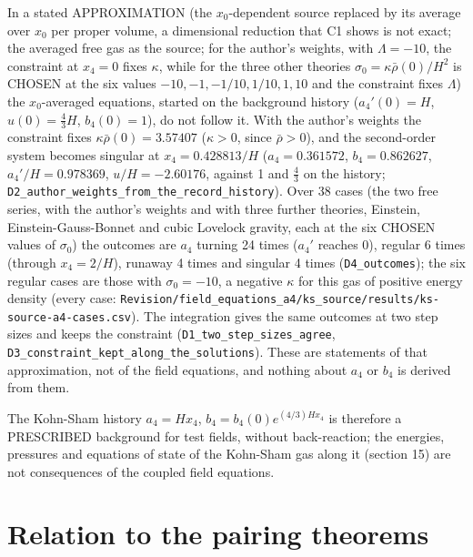 \documentclass[11pt]{article}
\begin{document}
In a stated APPROXIMATION (the $x_0$-dependent source replaced by its average over $x_0$ per proper volume, a dimensional reduction that C1 shows is not exact; the averaged free gas as the source; for the author's weights, with $\Lambda = -10$, the constraint at $x_4 = 0$ fixes $\kappa$, while for the three other theories $\sigma_0 = \kappa\bar\rho(0)/H^2$ is CHOSEN at the six values $-10, -1, -1/10, 1/10, 1, 10$ and the constraint fixes $\Lambda$) the $x_0$-averaged equations, started on the background history ($a_4'(0) = H$, $u(0) = \tfrac43H$, $b_4(0) = 1$), do not follow it. With the author's weights the constraint fixes $\kappa\bar\rho(0) = 3.57407$ ($\kappa > 0$, since $\bar\rho > 0$), and the second-order system becomes singular at $x_4 = 0.428813/H$ ($a_4 = 0.361572$, $b_4 = 0.862627$, $a_4'/H = 0.978369$, $u/H = -2.60176$, against 1 and $\tfrac43$ on the history; \texttt{D2\_autho\allowbreak{}r\_weight\allowbreak{}s\_from\_t\allowbreak{}he\_recor\allowbreak{}d\_histor\allowbreak{}y}). Over 38 cases (the two free series, with the author's weights and with three further theories, Einstein, Einstein-Gauss-Bonnet and cubic Lovelock gravity, each at the six CHOSEN values of $\sigma_0$) the outcomes are $a_4$ turning 24 times ($a_4'$ reaches 0), regular 6 times (through $x_4 = 2/H$), runaway 4 times and singular 4 times (\texttt{D4\_outco\allowbreak{}mes}); the six regular cases are those with $\sigma_0 = -10$, a negative $\kappa$ for this gas of positive energy density (every case: \texttt{Revision\allowbreak{}/field\_e\allowbreak{}quations\allowbreak{}\_a4/ks\_s\allowbreak{}ource/re\allowbreak{}sults/ks\allowbreak{}-source-\allowbreak{}a4-cases\allowbreak{}.csv}). The integration gives the same outcomes at two step sizes and keeps the constraint (\texttt{D1\_two\_s\allowbreak{}tep\_size\allowbreak{}s\_agree}, \texttt{D3\_const\allowbreak{}raint\_ke\allowbreak{}pt\_along\allowbreak{}\_the\_sol\allowbreak{}utions}). These are statements of that approximation, not of the field equations, and nothing about $a_4$ or $b_4$ is derived from them.

The Kohn-Sham history $a_4 = Hx_4$, $b_4 = b_4(0)e^{(4/3)Hx_4}$ is therefore a PRESCRIBED background for test fields, without back-reaction; the energies, pressures and equations of state of the Kohn-Sham gas along it (section 15) are not consequences of the coupled field equations.

\section{Relation to the pairing theorems}
\end{document}
